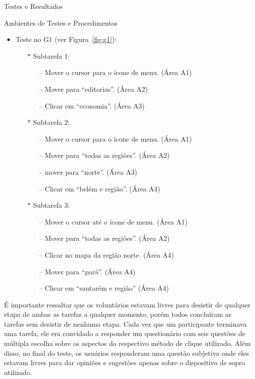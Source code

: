 \begin{chapter}{Testes e Resultados}
\begin{section}{Ambientes de Testes e Procedimentos}
\begin{itemize}
\item Teste no G1 (ver Figura~\ref{fig:g1}):
	\begin{itemize}
	\item[$\ast$] Subtarefa 1:
		\begin{itemize}
		\item[--] Mover o cursor para o ícone de menu.        \hfill (Área A1)
		\item[--] Mover para ``editorias''.                   \hfill (Área A2)
		\item[--] Clicar em ``economia''.                     \hfill (Área A3)
		\end{itemize}
	\item[$\ast$] Subtarefa 2:
		\begin{itemize}
		\item[--] Mover o cursor para o ícone de menu.        \hfill (Área A1)
		\item[--] Mover para ``todas as regiões''.            \hfill (Área A2)
		\item[--] mover para ``norte''.                       \hfill (Área A3)
		\item[--] Clicar em ``belém e região''.               \hfill (Área A4)
		\end{itemize}
	\item[$\ast$] Subtarefa 3:
		\begin{itemize}
		\item[--] Mover o cursor até o ícone de menu.         \hfill(Área A1)
		\item[--] Mover para ``todas as regiões''.            \hfill(Área A2)
		\item[--] Clicar no mapa da região norte.             \hfill(Área A4)
		\item[--] Mover para ``pará''.                        \hfill(Área A4)
		\item[--] Clicar em ``santarém e região''             \hfill(Área A4)
		\end{itemize}
	\end{itemize}
\end{itemize}

É importante ressaltar que os voluntários estavam livres para desistir de
qualquer etapa de ambas as tarefas a qualquer momento, porém todos concluíram as
tarefas sem desistir de nenhuma etapa. Cada vez que um participante terminava
uma tarefa, ele era convidado a responder um questionário com seis questões de
múltipla escolha sobre os aspectos do respectivo método de clique utilizado.
Além disso, no final do teste, os usuários responderam uma questão subjetiva
onde eles estavam livres para dar opiniões e sugestões apenas sobre o dispositivo
de sopro utilizado.
\end{section}


\end{chapter}
